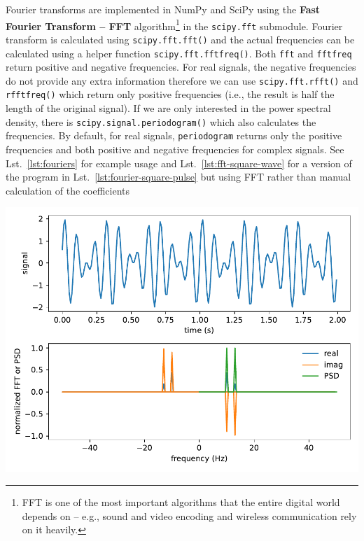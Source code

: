 \documentclass{article}
\newcommand{\ls}[1]{\lstinline{#1}}
\begin{document}
Fourier transforms are implemented in NumPy and SciPy using the \textbf{Fast Fourier Transform -- FFT} algorithm\footnote{FFT is one of the most important algorithms that the entire digital world depends on -- e.g., sound and video encoding and wireless communication rely on it heavily.} in the \ls{scipy.fft} submodule. Fourier transform is calculated using \ls{scipy.fft.fft()} and the actual frequencies can be calculated using a helper function \ls{scipy.fft.fftfreq()}. Both \ls{fft} and \ls{fftfreq} return positive and negative frequencies. For real signals, the negative frequencies do not provide any extra information therefore we can use \ls{scipy.fft.rfft()} and \ls{rfftfreq()} which return only positive frequencies (i.e., the result is half the length of the original signal). If we are only interested in the power spectral density, there is \ls{scipy.signal.periodogram()} which also calculates the frequencies. By default, for real signals, \ls{periodogram} returns only the positive frequencies and both positive and negative frequencies for complex signals. See Lst.~\ref{lst:fouriers} for example usage and Lst.~\ref{lst:fft-square-wave} for a version of the program in Lst.~\ref{lst:fourier-square-pulse} but using FFT rather than manual calculation of the coefficients


\begin{center}
    \includegraphics[width=0.5\linewidth]{fouriers.pdf}
\end{center}


\end{document}
